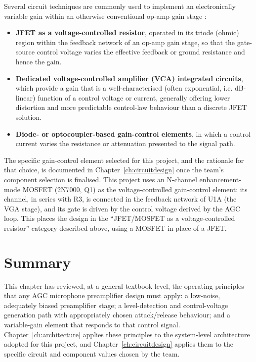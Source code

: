 Several circuit techniques are commonly used to implement an electronically variable gain within an otherwise conventional op-amp gain stage \cite{ref1,ref5,ref6}:
\begin{itemize}
    \item \textbf{JFET as a voltage-controlled resistor}, operated in its triode (ohmic) region within the feedback network of an op-amp gain stage, so that the gate-source control voltage varies the effective feedback or ground resistance and hence the gain.
    \item \textbf{Dedicated voltage-controlled amplifier (VCA) integrated circuits}, which provide a gain that is a well-characterised (often exponential, i.e. dB-linear) function of a control voltage or current, generally offering lower distortion and more predictable control-law behaviour than a discrete JFET solution.
    \item \textbf{Diode- or optocoupler-based gain-control elements}, in which a control current varies the resistance or attenuation presented to the signal path.
\end{itemize}
The specific gain-control element selected for this project, and the rationale for that choice, is documented in Chapter~\ref{ch:circuitdesign} once the team's component selection is finalised. This project uses an N-channel enhancement-mode MOSFET (2N7000, Q1) as the voltage-controlled gain-control element: its channel, in series with R3, is connected in the feedback network of U1A (the VGA stage), and its gate is driven by the control voltage derived by the AGC loop. This places the design in the ``JFET/MOSFET as a voltage-controlled resistor'' category described above, using a MOSFET in place of a JFET.

\section{Summary}

This chapter has reviewed, at a general textbook level, the operating principles that any AGC microphone preamplifier design must apply: a low-noise, adequately biased preamplifier stage; a level-detection and control-voltage generation path with appropriately chosen attack/release behaviour; and a variable-gain element that responds to that control signal. Chapter~\ref{ch:architecture} applies these principles to the system-level architecture adopted for this project, and Chapter~\ref{ch:circuitdesign} applies them to the specific circuit and component values chosen by the team.
